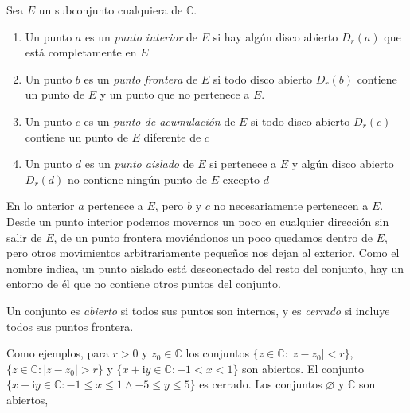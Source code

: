   \begin{definition}
    Sea \(E\) un subconjunto cualquiera de \(\mathbb{C}\).
    \begin{enumerate}[label=(\roman*), ref=(\roman*)]
    \item
      Un punto \(a\) es un \emph{punto interior} de \(E\)
      si hay algún disco abierto \(D_r(a)\)
      que está completamente en \(E\)
    \item
      Un punto \(b\) es un \emph{punto frontera} de \(E\)
      si todo disco abierto \(D_r(b)\) contiene un punto de \(E\)
      y un punto que no pertenece a \(E\).
    \item
      Un punto \(c\) es un \emph{punto de acumulación} de \(E\)
      si todo disco abierto \(D_r(c)\) contiene un punto de \(E\)
      diferente de \(c\)
    \item
      Un punto \(d\) es un \emph{punto aislado}	 de \(E\)
      si pertenece a \(E\) y algún disco abierto \(D_r(d)\)
      no contiene ningún punto de \(E\) excepto \(d\)
    \end{enumerate}
  \end{definition}
  En lo anterior \(a\) pertenece a \(E\),
  pero \(b\) y \(c\) no necesariamente pertenecen a \(E\).
  Desde un punto interior
  podemos movernos un poco en cualquier dirección
  sin salir de \(E\),
  de un punto frontera moviéndonos un poco quedamos dentro de \(E\),
  pero otros movimientos arbitrariamente pequeños
  nos dejan al exterior.
  Como el nombre indica,
  un punto aislado está desconectado del resto del conjunto,
  hay un entorno de él que no contiene otros puntos del conjunto.
  \begin{definition}
    Un conjunto es \emph{abierto} si todos sus puntos son internos,
    y es \emph{cerrado} si incluye todos sus puntos frontera.
  \end{definition}
  Como	ejemplos,
  para \(r > 0\) y \(z_0 \in \mathbb{C}\)
  los conjuntos
    \(\{z \in \mathbb{C} \colon \lvert z - z_0 \rvert < r\}\),
  \(\{z \in \mathbb{C} \colon \lvert z - z_0 \rvert > r\}\)
  y \(\{x + \mathrm{i} y \in \mathbb{C} \colon -1 < x < 1\}\)
  son abiertos.
  El conjunto
    \(\{ x + \mathrm{i} y \in \mathbb{C}
	   \colon -1 \le x \le 1 \wedge -5 \le y \le 5\}\)
  es cerrado.
  Los conjuntos \(\varnothing\) y \(\mathbb{C}\) son abiertos,

